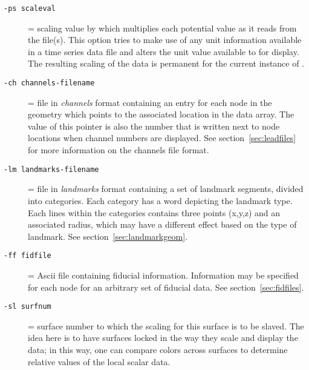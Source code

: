 \begin{description}
  \item[{\tt-ps scaleval}] = scaling value by which \map{} multiplies each
    potential value as it reads from the file(s).  This option tries to
    make use of any unit information available in a time series data file
    and alters the unit value available to \map{} for display.  The
    resulting scaling of the data is permanent for the current instance of
    \map{}.
        
  \item[{\tt -ch channels-filename}] = file in {\em channels\/} format
    containing an entry for each node in the geometry which points to the
    associated location in the data array.  The value of this pointer is
    also the number that is written next to node locations when channel
    numbers are displayed.  See section~\ref{sec:leadfiles} for more
    information on the channels file format.
        
  \item[{\tt -lm landmarks-filename}] = file in {\em landmarks\/} format
    containing a set of landmark segments, divided into categories.  Each
    category has a word depicting the landmark type.  Each lines within the
    categories contains three points (x,y,z) and an associated radius,
    which may have a different effect based on the type of landmark.
    See section~\ref{sec:landmarkgeom}.

  
  \item[{\tt-ff fidfile}] = Ascii file containing fiducial information.
  Information may be specified for each node for an arbitrary set of 
  fiducial data.  See section~\ref{sec:fidfiles}.
      
  \item[{\tt-sl surfnum}] = surface number to which the scaling for this
    surface is to be slaved.  The idea here is to have surfaces locked in
    the way they scale and display the data; in this way, one can compare
    colors across surfaces to determine relative values of the local scalar
    data.
    

\end{description}
